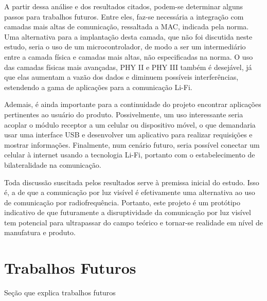 	A partir dessa análise e dos resultados citados, podem-se determinar alguns passos para trabalhos futuros. Entre eles, faz-se necessária a integração com camadas mais altas de comunicação, ressaltada a MAC, indicada pela norma. Uma alternativa para a implantação desta camada, que não foi discutida neste estudo, seria o uso de um microcontrolador, de modo a ser um intermediário entre a camada física e camadas mais altas, não especificadas na norma. O uso das camadas físicas mais avançadas, PHY II e PHY III também é desejável, já que elas aumentam a vazão dos dados e diminuem possíveis interferências, estendendo a gama de aplicações para a comunicação Li-Fi.
	
	Ademais, é ainda importante para a continuidade do projeto encontrar aplicações pertinentes ao usuário do produto. Possivelmente, um uso interessante seria acoplar o módulo receptor a um celular ou dispositivo móvel, o que demandaria usar uma interface USB e desenvolver um aplicativo para realizar requisições e mostrar informações. Finalmente, num cenário futuro, seria possível conectar um celular à internet usando a tecnologia Li-Fi, portanto com o estabelecimento de bilateralidade na comunicação.
	
	Toda discussão suscitada pelos resultados serve à premissa inicial do estudo. Isso é, a de que a comunicação por luz visível é efetivamente uma alternativa ao uso de comunicação por radiofrequência. Portanto, este projeto é um protótipo indicativo de que futuramente a disruptividade da comunicação por luz visível tem potencial para ultrapassar do campo teórico e tornar-se realidade em nível de manufatura e produto. 
	
	\section{Trabalhos Futuros}
	
	Seção que explica trabalhos futuros